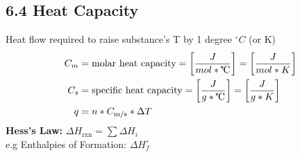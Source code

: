 \subsection{6.4 Heat Capacity}
    Heat flow required to raise substance's T by 1 degree $^\circ C$ (or K)
    \begin{align*}
        C_m & = \text{molar heat capacity} = \left[\frac{J}{mol*\tccentigrade}\right] = \left[\frac{J}{mol*K}\right]\\
        C_s & = \text{specific heat capacity} = \left[\frac{J}{g*\tccentigrade}\right] = \left[\frac{J}{g*K}\right]\\
        q & = n*C_\text{m/s}*\Delta T
    \end{align*}
    \textbf{Hess's Law:} $\Delta H_\text{rxn} = \sum \Delta H_i$\\
    e.g Enthalpies of Formation: $\Delta H^\circ_f$